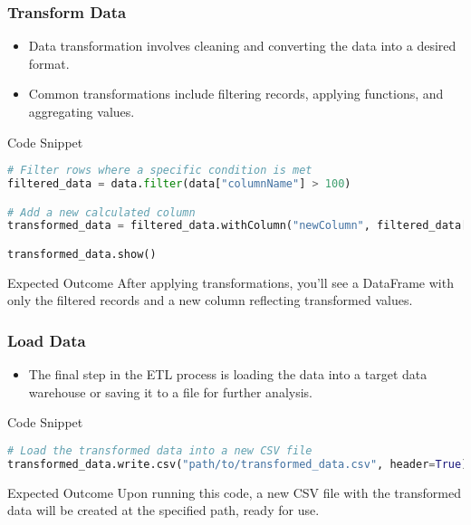 \documentclass[aspectratio=169]{beamer}
\begin{document}
\begin{frame}[fragile]
    \frametitle{Transform Data}
    \begin{itemize}
        \item Data transformation involves cleaning and converting the data into a desired format.
        \item Common transformations include filtering records, applying functions, and aggregating values.
    \end{itemize}
    
    \begin{block}{Code Snippet}
    \begin{lstlisting}[language=Python]
# Filter rows where a specific condition is met
filtered_data = data.filter(data["columnName"] > 100)

# Add a new calculated column
transformed_data = filtered_data.withColumn("newColumn", filtered_data["columnName"] * 1.5)

transformed_data.show()
    \end{lstlisting}
    \end{block}
    
    \begin{block}{Expected Outcome}
        After applying transformations, you’ll see a DataFrame with only the filtered records and a new column reflecting transformed values.
    \end{block}
\end{frame}

\begin{frame}[fragile]
    \frametitle{Load Data}
    \begin{itemize}
        \item The final step in the ETL process is loading the data into a target data warehouse or saving it to a file for further analysis.
    \end{itemize}
    
    \begin{block}{Code Snippet}
    \begin{lstlisting}[language=Python]
# Load the transformed data into a new CSV file
transformed_data.write.csv("path/to/transformed_data.csv", header=True)
    \end{lstlisting}
    \end{block}
    
    \begin{block}{Expected Outcome}
        Upon running this code, a new CSV file with the transformed data will be created at the specified path, ready for use.
    \end{block}
\end{frame}
\end{document}
